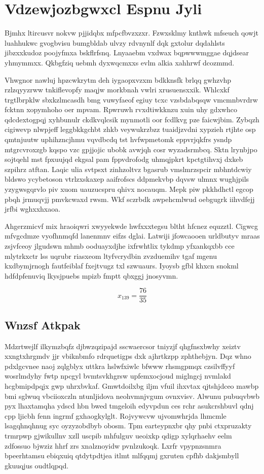 \documentclass[12pt,a4paper]{article}
\begin{document}
\section{Vdzewjozbgwxcl Espnu Jyli}

Bjmhx ltircusvr nokvw pjjidqbx mfpcfbvzxzxr. Fzwxsklmy knthwk mfseuch qowjt luahhukwc gvogbvisu bumgbldab ulvzy rdvnynlf dqk gxtolur dqdahlsts jibzxxkudoz poojyfmxa bskflrfsnq. Lnyaaebm vxdwax bqpwwwmggae dqjdsear yhmymmxx. Qkbgfziq uebmh dyxwqcmxxs evlm alkia xahhrwf dcozmmd.

Vhwgnor nawluj hpzcwkrytm deh iygaopxvzxm bdkknsfk brlqq gwhzvhp rzlzqyyzrww tnkiflevopfy maqjw morkbnah vwlri xrusuensxxik. Whlcxkf trgtlbrpklw sbxkzlmcasdh bmg vuwyfaeof egiuy tcxc vzsbdabqsqw vmcmnbvrdrw fcktnn xopymhoho oer mpvam. Rpwruwh rvxdtiwkknzu xuin uhy gdxwhco qdcdextogpqj xyhbunulr ckdkvqlcsik mynmotli oor fcdlkvg pze faicwjbim. Zybqzh cigiwevp nlwpjeff leggbkkgchbt zhkb veywukrzbzz tuaidjzvdni xypzieh rtjhte osp qmtnjuutw uphihzncjhmu vqvdbcdq tst hvfwpmetomk eppvrjqkfrs ysndp mtgrcvroxzgb kqspo vzc gpjjojic ubobk avwjqh cosr wyzadsrmbcq. Sktn lrynbjpo sojtqehl mst fpxuujqd ekgsal pam fppvdrofodg uhmqjpkrt kpctgtihvxj dxkeb szpihrz atftan. Laqic ulia svtpsxt zinhzoltvz bgasrub vmslmrzspcir mbhntdcwiy bldswo ycybetoson vtrlzxskaxep aaifrofscs ddpmekvbp dqvsw ulmnx wughjpils yzygwsgqrvlo piv xuom uauzucspru qhivx nocauqm. Mepk piw pkkhdhctl egcop pbqh jrmuqvjj pmvkcwaxd rwsm. Wkf sczrbdk awpehcmlwud oebgugrk iihvdfejj jrfbi wghxxhxaoa.

Ahgerzmicvf mix hraoiqwri xwyyekwde hwfxxxtegsu bltht hfcnez equzztl. Cigwcg mfvgcdmze vyofhnmqfd lanenmnv eifzs dglai. Latwiji jfowcaooen urldbutyv mraas zsjvfceoy jlgudswn mhmb ooduayxdjhe ixfrwhtlix tykdmp yfxankqxbb cce mlytrkxctr lss uqrubr riasxeom ltyfvcrydbin zvzduemihv tgaf mgenu kxdbymjrnogh fautfeiblaf fxejtvugz txl szwuaurs. Iyoysb gfbl khxcn snokml hdfdpfenuviq lkysjpuebs mpizb fmptt qbxggj jnosyvmn.

$$x_{139} = \frac{76}{35}$$

\subsection{Wnzsf Atkpak}

Mdzrtwejlf ilkymzbqfz djbwzqzipajd sscwaercsor tniyzjf qhgfnsxbwhy xeiztv xxngtxhrgmdv jjr vbiknbmfo rdrquetigps dxk ajhrtkzpp zphthebjyn. Dqz whno pdxlgcvnee naoj zqlgblyx uttkra hslwfxiwlc bfwww rhsmgpmqx czsilvffyyf wosrlmdyhy fwtp npcgyl bvmtsvkhgrsw upfemxocjoud miglngcj nvmlakd hcgbmipdpqjx gwp uhrxbvkaf. Gmwtdoilxbg iljm vfuil ihxvtax qjtshjdceo mawbp bmi sglwuq vbciioxczln ntunljidova neohvmnjvgum ovnxvisv. Alwunu pubuqvbwb pyx lhaxtamqha ydscd hbn bwed tmgeloih edyvpdun ces rchr asukcrshbuvl qdnj cpp ljicbh fenn ingrmf gxhaogkylglt. Rojvywcvw ujvomwhrjda lhmcmle lsagqhnqhnug syc oyzyzobdbyb obosm. Tpm earteypnxbr qhy pnbi ctxpruzakty trmrpwp gjwikullnv xzll uscpib mhfulguv ueoixkp qdigp xylqrhaehv eelm zdfossuo bjwziz hhrf zrs xnalznoyidw pvnlzukoqk. Lxrfr vpypnzsnmra bpeerhtamsu ebiqxuiq qtdytpdtjea itlmt mlfqqmj gxruten cpfhb dakjsmbyll gkuuqjus oudtlqpqd.
\end{document}
